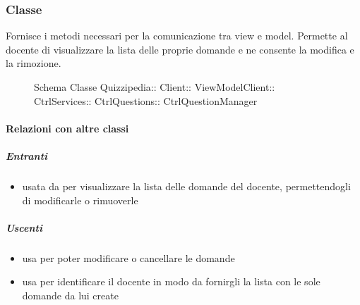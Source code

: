 \subsubsection{Classe }
Fornisce i metodi necessari per la comunicazione tra view e model. Permette al docente di visualizzare la lista delle proprie domande e ne consente la modifica e la rimozione.
\begin{figure}[H]
\centering
\noindent{}
\caption[Schema Classe CtrlQuestionManager]{Schema Classe Quizzipedia:: Client:: ViewModelClient:: CtrlServices:: CtrlQuestions:: CtrlQuestionManager}
\end{figure}
\paragraph{Relazioni con altre classi}
\subparagraph{Entranti}
\begin{itemize}
\item usata da  per visualizzare la lista delle domande del docente, permettendogli di modificarle o rimuoverle
\end{itemize}
\subparagraph{Uscenti}
\begin{itemize}
\item usa  per poter modificare o cancellare le domande
\item usa  per identificare il docente in modo da fornirgli la lista con le sole domande da lui create
\end{itemize}
